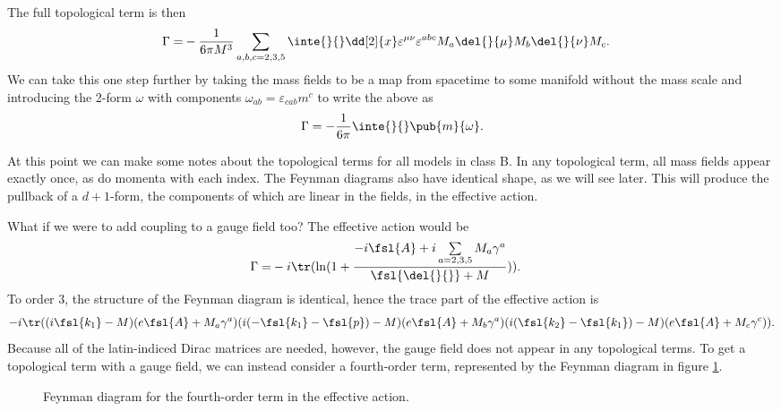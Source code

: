 The full topological term is then
\begin{align*}
	\Gamma =& -\frac{1}{6\pi M^{3}}\sum\limits_{a, b, c = 2, 3, 5}\inte{}{}\dd[2]{x}\varepsilon^{\mu\nu}\varepsilon^{abc}M_{a}\del{}{\mu}M_{b}\del{}{\nu}M_{c}.
\end{align*}
We can take this one step further by taking the mass fields to be a map from spacetime to some manifold without the mass scale and introducing the 2-form $\omega$ with components $\omega_{ab} = \varepsilon_{cab}m^{c}$ to write the above as
\begin{align*}
	\Gamma = -\frac{1}{6\pi}\inte{}{}\pub{m}{\omega}.
\end{align*}

At this point we can make some notes about the topological terms for all models in class B. In any topological term, all mass fields appear exactly once, as do momenta with each index. The Feynman diagrams also have identical shape, as we will see later. This will produce the pullback of a $d + 1$-form, the components of which are linear in the fields, in the effective action.

What if we were to add coupling to a gauge field too? The effective action would be
\begin{align*}
	\Gamma =& -i\tr(\ln(1 + \frac{-i\fsl{A} + i\sum\limits_{a = 2, 3, 5}M_{a}\gamma^{a}}{\fsl{\del{}{}} + M})).
\end{align*}
To order $3$, the structure of the Feynman diagram is identical, hence the trace part of the effective action is
\begin{align*}
	-i\tr((i\fsl{k_{1}} - M)(e\fsl{A} + M_{a}\gamma^{a})(i(-\fsl{k_{1}} - \fsl{p}) - M)(e\fsl{A} + M_{b}\gamma^{a})(i(\fsl{k_{2}} - \fsl{k_{1}}) - M)(e\fsl{A} + M_{c}\gamma^{c})).
\end{align*}
Because all of the latin-indiced Dirac matrices are needed, however, the gauge field does not appear in any topological terms. To get a topological term with a gauge field, we can instead consider a fourth-order term, represented by the Feynman diagram in figure \ref{fig:fourth_order_1d_fd}.

\begin{figure}[!ht]
	\centering
	\caption{Feynman diagram for the fourth-order term in the effective action.}
	\label{fig:fourth_order_1d_fd}
\end{figure}

